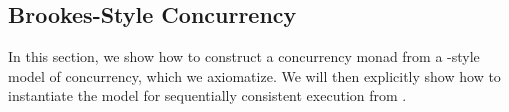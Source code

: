\documentclass[acmsmall,screen,anonymous,review]{acmart}
\newcounter{todos}
\newcommand{\TODO}[1]{{
  \stepcounter{todos}
  \begin{center}\large{\textcolor{red}{\textbf{TODO \arabic{todos}:} #1}}\end{center}
}}
\begin{document}







\subsection{Brookes-Style Concurrency}

\label{apx:rel-acq}

In this section, we show how to construct a concurrency monad from a
\citet{brookes-full-abstraction-96}-style model of concurrency, which we axiomatize.
We will then explicitly show how to instantiate the model for sequentially consistent execution
from \citet{brookes-full-abstraction-96}.
\end{document}
